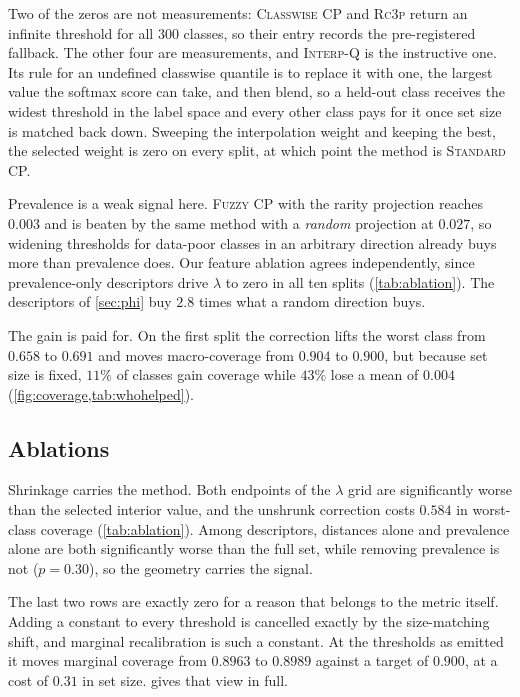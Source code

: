 Two of the zeros are not measurements: \textsc{Classwise} CP and \textsc{Rc3p} return an
infinite threshold for all $300$ classes, so their entry records the pre-registered fallback.
The other four are measurements, and \textsc{Interp-Q} is the instructive one. Its rule for an
undefined classwise quantile is to replace it with one, the largest value the softmax score can
take, and then blend, so a held-out class receives the widest threshold in the label space and
every other class pays for it once set size is matched back down. Sweeping the interpolation
weight and keeping the best, the selected weight is zero on every split, at which point the
method is \textsc{Standard} CP.

Prevalence is a weak signal here. \textsc{Fuzzy} CP with the rarity projection reaches $0.003$
and is beaten by the same method with a \emph{random} projection at $0.027$, so widening
thresholds for data-poor classes in an arbitrary direction already buys more than prevalence
does. Our feature ablation agrees independently, since prevalence-only descriptors drive
$\lambda$ to zero in all ten splits (\cref{tab:ablation}). The descriptors of \cref{sec:phi}
buy $2.8$ times what a random direction buys.

The gain is paid for. On the first split the correction lifts the worst class from $0.658$ to
$0.691$ and moves macro-coverage from $0.904$ to $0.900$, but because set size is fixed,
$11\%$ of classes gain coverage while $43\%$ lose a mean of $0.004$
(\cref{fig:coverage,tab:whohelped}).


\subsection{Ablations}
\label{sec:ablations}

Shrinkage carries the method. Both endpoints of the $\lambda$ grid are significantly worse
than the selected interior value, and the unshrunk correction costs $0.584$ in worst-class
coverage (\cref{tab:ablation}). Among descriptors, distances alone and prevalence alone are
both significantly worse than the full set, while removing prevalence is not ($p=0.30$), so
the geometry carries the signal.

The last two rows are exactly zero for a reason that belongs to the metric itself. Adding a constant to every threshold is cancelled exactly by the size-matching
shift, and marginal recalibration is such a constant. At the thresholds as emitted it moves
marginal coverage from $0.8963$ to $0.8989$ against a target of $0.900$, at a cost of $0.31$
in set size.  gives that view in full.


